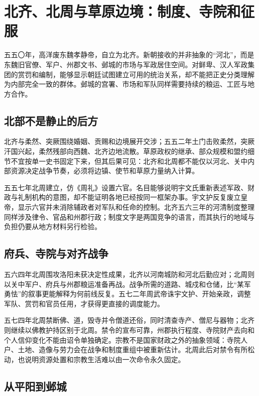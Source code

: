 \section{北齐、北周与草原边境：制度、寺院和征服}
\label{sec:north-qi-north-zhou-frontiers-religion}

五五〇年，高洋废东魏孝静帝，自立为北齐。新朝接收的并非抽象的“河北”，而是东魏旧官僚、军户、州郡文书、邺城的市场与军政居住空间。对鲜卑、汉人军政集团的赏罚和编制，能够显示朝廷试图建立可用的统治关系，却不能把正史分类理解为内部完全一致的群体。邺城的宫署、市场和军队同样需要持续的粮运、工匠与地方合作。

\subsection{北部不是静止的后方}

北齐与柔然、突厥围绕婚姻、贡赐和边境展开交涉；五五二年土门击败柔然，突厥汗国兴起，柔然残部向西魏、北齐边地流散。草原政权的继承、部众规模和盟约细节不宜按单一史书固定下来，但其后果可见：北齐和北周都不能仅以河北、关中内部资源决定战争节奏，必须将边镇、使节和草原力量纳入计算。

五五七年北周建立，仿《周礼》设置六官。名目能够说明宇文氏重新表述军政、财政与礼制机构的意图，却不能证明各地已经按同一框架办事。宇文护反复废立皇帝，显示六官并未消除辅政者对军队和任命的控制。北齐五六三年的河清制度整理同样涉及律令、官品和州郡行政；制度文字是两国竞争的语言，而其执行的地域与负担仍要从地方材料另行检验。

\subsection{府兵、寺院与对齐战争}

五六四年北周围攻洛阳未获决定性成果，北齐以河南城防和河北后勤应对；北周则以关中军户、府兵与州郡粮运准备再战。战争所需的道路、城戍和仓储，比“某军勇怯”的叙事更能解释为何前线反复。五七二年周武帝诛宇文护、开始亲政，调整军队、赏罚和官员任用，才获得更直接的调度能力。

五七四年北周禁断佛、道，毁寺并令僧道还俗，同时清查寺产、僧尼与器物；北齐则继续以佛教护持区别于北周。禁令的宣布可靠，州郡执行程度、寺院财产去向和个人信仰变化不能由诏令单独确定。宗教不是国家财政之外的抽象领域：寺院人户、土地、造像与劳力会在战争和制度重组中被重新估计。北周此后对禁令有所松动，也说明资源处置和宗教生活难以由一次命令永久固定。

\subsection{从平阳到邺城}

